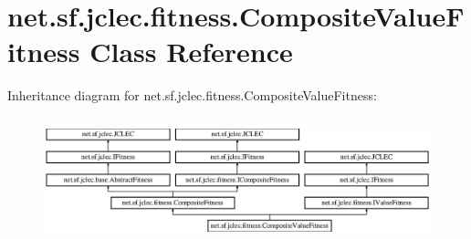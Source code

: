 \hypertarget{classnet_1_1sf_1_1jclec_1_1fitness_1_1_composite_value_fitness}{\section{net.\-sf.\-jclec.\-fitness.\-Composite\-Value\-Fitness Class Reference}
\label{classnet_1_1sf_1_1jclec_1_1fitness_1_1_composite_value_fitness}
}
Inheritance diagram for net.\-sf.\-jclec.\-fitness.\-Composite\-Value\-Fitness\-:\begin{figure}[H]
\begin{center}
\leavevmode
\includegraphics[height=3.631647cm]{classnet_1_1sf_1_1jclec_1_1fitness_1_1_composite_value_fitness}
\end{center}
\end{figure}
